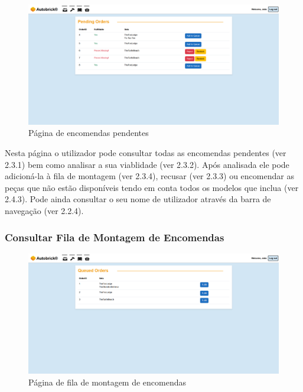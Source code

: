                             \begin{figure}[h!]
                                \centering
                                \includegraphics[width=0.8\linewidth, frame]{images/Site/Pending Orders.pdf}
                                \caption{Página de encomendas pendentes}
                                \label{fig:Página de encomendas pendentes}
                            \end{figure}

                    Nesta página o utilizador pode consultar todas as encomendas pendentes (ver 2.3.1) bem como analisar a sua viablidade (ver 2.3.2). Após analisada ele pode adicioná-la à fila de montagem (ver 2.3.4), recusar (ver 2.3.3) ou encomendar as peças que não estão disponíveis tendo em conta todos os modelos que inclua (ver 2.4.3). Pode ainda consultar o seu nome de utilizador através da barra de navegação (ver 2.2.4).

                
                \subsubsection{Consultar Fila de Montagem de Encomendas}
                    
                    \begin{figure}[h!]
                        \centering
                        \includegraphics[width=0.8\linewidth, frame]{images/Site/Queued Orders.pdf}
                        \caption{Página de fila de montagem de encomendas}
                        \label{fig:Página de fila de montagem de encomendas}
                    \end{figure}

